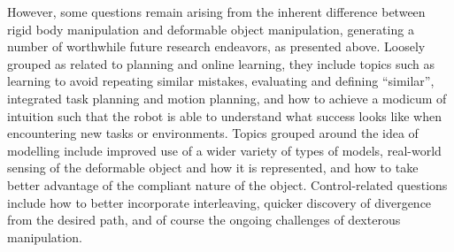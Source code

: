 However, some questions remain arising from the inherent difference between rigid body manipulation and deformable object manipulation, generating a number of worthwhile future research endeavors, as presented above. Loosely grouped as related to planning and online learning, they include topics such as learning to avoid repeating similar mistakes, evaluating and defining ``similar'', integrated task planning and motion planning, and how to achieve a modicum of intuition such that the robot is able to understand what success looks like when encountering new tasks or environments. Topics grouped around the idea of modelling include improved use of a wider variety of types of models, real-world sensing of the deformable object and how it is represented, and how to take better advantage of the compliant nature of the object. Control-related questions include how to better incorporate interleaving, quicker discovery of divergence from the desired path, and of course the ongoing challenges of dexterous manipulation.

